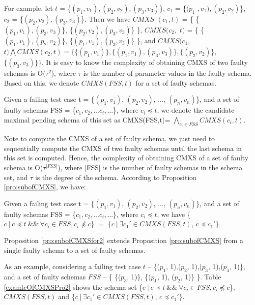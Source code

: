 For example, let $t$ = \{$(p_{1},v_{1}), (p_{2}, v_{2}), (p_{3}, v_{3})$\}, $c_{1}$ = \{$(p_{1}$ $, v_{1}), (p_{2}, v_{2})$\}, $c_{2}$ = \{$(p_{2}, v_{2}), (p_{3}, v_{3})$\}. Then we have $CMXS$ $(c_{1}, t)$ = \{ \{$(p_{1}, v_{1}), (p_{3}, v_{3})$\}, \{$(p_{2}, v_{2}), (p_{3}, v_{3})$\} \}, $CMXS(c_{2},$ $ t)$ = \{ \{$(p_{1}, v_{1}), (p_{2}, v_{2})$\}, \{$(p_{1}, v_{1}), (p_{3}, v_{3})$\} \}, and  $CMXS(c_{1},$ $ t) \bigwedge CMXS(c_{2}, t) = \{ \{(p_{1}, v_{1})\}, \{(p_{1}, v_{1}), (p_{3}, v_{3})\}, \{(p_{2}, v_{2})\}, $ $\{(p_{3}, v_{3})\} \} $. It is easy to know the complexity of obtaining CMXS of two faulty schemas is O($\tau^{2}$), where $\tau$ is the number of parameter values in the faulty schema. Based on this, we denote $CMXS(FSS,t)$ for a set of faulty schemas.

\begin{definition}
Given a failing test case t = \{$(p_{1}, v_{1})$, $(p_{2}, v_{2})$, ..., $(p_{n}, v_{n})$\}, and a set of faulty schemas FSS = \{$c_{1} , c_{2}, ... c_{i}, ...$\}, where $ c_{i} \preceq t$,  we denote the candidate maximal pending schema of this set as CMXS(FSS,t)= $\bigwedge_{c_{i}\in FSS} CMXS(c_{i}, t)$.
\end{definition}

Note to compute the CMXS of a set of faulty schema, we just need to sequentially compute the CMXS of two faulty schemas until the last schema in this set is computed. Hence, the complexity of obtaining CMXS of a set of faulty schema is O($\tau^{|FSS|}$), where |FSS| is the number of faulty schemas in the schema set, and $\tau$ is the degree of the schema. According to Proposition \ref{pro:subofCMXS}, we have:

\begin{proposition}\label{pro:subofCMXSfor2}
Given a failing test case t = \{$(p_{1}, v_{1})$, $(p_{2}, v_{2})$, ..., $(p_{n}, v_{n})$\}, and a set of faulty schemas FSS = \{$c_{1} , c_{2}, ... c_{i}, ...$\}, where $ c_{i} \preceq t$,  we have \{$c\ |\ c \preceq t\ \&\&\ \forall c_{i} \in FSS, c_{i} \npreceq c $\} $=$  \{$ c\ |\ \exists c_{1}' \in CMXS(FSS, t)$, $c \preceq c_{1}'$\}.
\end{proposition}

Proposition \ref{pro:subofCMXSfor2} extends Proposition \ref{pro:subofCMXS} from a single faulty schema to a set of faulty schemas.

As an example, considering a failing test case $t$ -- \{($p_{1}$, 1),($p_{2}$, 1),($p_{3}$, 1),($p_{4}$, 1)\}, and a set of faulty schemas  $FSS$ -- \{ \{($p_{3}$, 1)\},  \{($p_{1}$, 1), ($p_{2}$, 1)\} \}. Table \ref{examleOfCMXSPro2} shows the schema set \{$c\ |\ c \prec t\ \&\&\ \forall c_{i} \in FSS, c_{i} \npreceq c $\}, $CMXS(FSS, t)$ and \{$ c\ |\ \exists c_{1}' \in CMXS(FSS, t)$, $c \preceq c_{1}'$\}.

